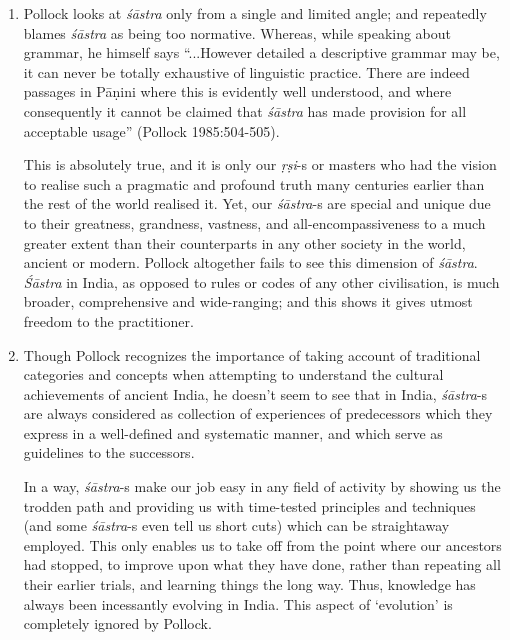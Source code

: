 \begin{enumerate}
\item Pollock looks at {\it śāstra} only from a single and limited angle; and repeatedly blames {\it śāstra} as being too normative. Whereas, while speaking about grammar, he himself says ``...However detailed a descriptive grammar may be, it can never be totally exhaustive of linguistic practice. There are indeed passages in Pāṇini where this is evidently well understood, and where consequently it cannot be claimed that {\it śāstra} has made provision for all acceptable usage'' (Pollock 1985:504-505). 

This is absolutely true, and it is only our {\it ṛṣi}-s or masters who had the vision to realise such a pragmatic and profound truth many centuries earlier than the rest of the world realised it.  Yet, our {\it śāstra}-s are special and unique due to their greatness, grandness, vastness, and all-encompassiveness to a much greater extent than their counterparts in any other society in the world, ancient or modern. Pollock altogether fails to see this dimension of {\it śāstra}. {\it Śāstra} in India, as opposed to rules or codes of any other civilisation, is much broader, comprehensive and wide-ranging; and this shows it gives utmost freedom to the practitioner.

\item Though Pollock recognizes the importance of taking account of traditional categories and concepts when attempting to understand the cultural achievements of ancient India, he doesn't seem to see that in India, {\it śāstra}-s are always considered as collection of experiences of predecessors which they express in a well-defined and systematic manner, and which serve as guidelines to the successors. 

In a way, {\it śāstra}-s make our job easy in any field of activity by showing us the trodden path and providing us with time-tested principles and techniques (and some {\it śāstra}-s even tell us short cuts) which can be straightaway employed. This only enables us to take off from the point where our ancestors had stopped, to improve upon what they have done, rather than repeating all their earlier trials, and learning things the long way. Thus, knowledge has always been incessantly evolving in India. This aspect of `evolution' is completely ignored by Pollock.


\end{enumerate}
